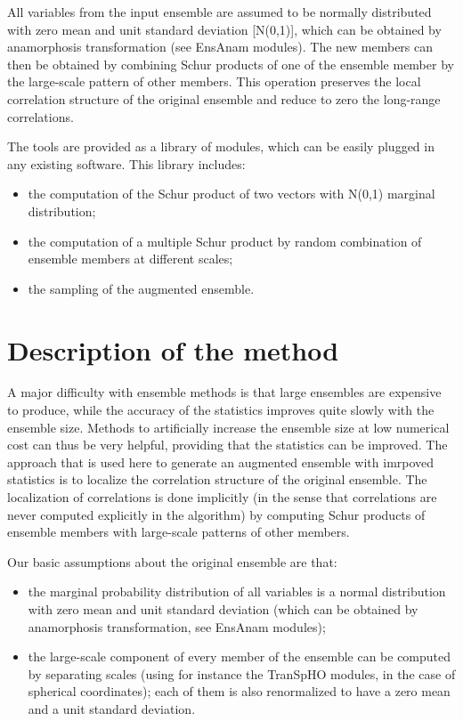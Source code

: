 \documentclass[11pt]{article}
\begin{document}
All variables from the input ensemble are assumed to be normally
distributed with zero mean and unit standard deviation [N(0,1)],
which can be obtained by anamorphosis transformation (see EnsAnam modules).
The new members can then be obtained by combining Schur products
of one of the ensemble member by the large-scale pattern of other members.
This operation preserves the local correlation structure of the original ensemble
and reduce to zero the long-range correlations.

The tools are provided as a library of modules,
which can be easily plugged in any existing software.
This library includes:

\begin{itemize}
\item the computation of the Schur product of two vectors with N(0,1) marginal distribution;
\item the computation of a multiple Schur product by random combination of ensemble members at different scales;
\item the sampling of the augmented ensemble.
\end{itemize}

\clearpage

\pagestyle{plain}

\section{Description of the method}

A major difficulty with ensemble methods is that large ensembles are expensive to produce,
while the accuracy of the statistics improves quite slowly with the ensemble size.
Methods to artificially increase the ensemble size at low numerical cost
can thus be very helpful, providing that the statistics can be improved.
The approach that is used here to generate an augmented ensemble with imrpoved statistics
is to localize the correlation structure of the original ensemble.
The localization of correlations is done implicitly
(in the sense that correlations are never computed explicitly in the algorithm)
by computing Schur products of ensemble members with large-scale patterns of other members.

Our basic assumptions about the original ensemble are that:

\begin{itemize}
\item the marginal probability distribution of all variables is a normal distribution
with zero mean and unit standard deviation (which can be obtained
by anamorphosis transformation, see EnsAnam modules);
\item the large-scale component of every member of the ensemble can be computed
by separating scales (using for instance the TranSpHO modules,
in the case of spherical coordinates);
each of them is also renormalized to have a zero mean and a unit standard deviation.
\end{itemize}
\end{document}
